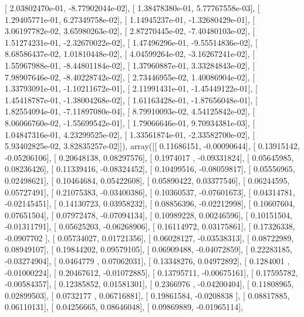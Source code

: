 \documentclass{article}
\begin{document}
       [  2.03802470e-01,  -8.77902044e-02],
       [  1.38478380e-01,   5.77767558e-03],
       [  1.29405771e-01,   6.27349758e-02],
       [  1.14945237e-01,  -1.32680429e-01],
       [  3.06197782e-02,   3.65980263e-02],
       [  2.87270445e-02,  -7.40480103e-02],
       [  1.51274231e-01,  -2.32670022e-02],
       [  1.47496296e-01,  -9.55514836e-02],
       [  8.68586437e-02,   1.01810448e-02],
       [  4.04599264e-02,  -3.16267241e-02],
       [  1.55967988e-01,  -8.44801184e-02],
       [  1.37960887e-01,   3.33284843e-02],
       [  7.98907646e-02,  -8.40228742e-02],
       [  2.73446955e-02,   1.40086904e-02],
       [  1.33793091e-01,  -1.10211672e-01],
       [  2.11991431e-01,  -1.45449122e-01],
       [  1.45418787e-01,  -1.38004268e-02],
       [  1.61163428e-01,  -1.87656048e-01],
       [  1.82554094e-01,  -7.11897080e-04],
       [  8.79910093e-02,   4.54125842e-02],
       [  8.06066760e-02,  -1.55699542e-01],
       [  1.79066646e-01,   9.70934381e-03],
       [  1.04847316e-01,   4.23299525e-02],
       [  1.33561874e-01,  -2.33582700e-02],
       [  5.93402825e-02,   3.82835257e-02]]), array([[ 0.11686151, -0.00090644],
       [ 0.13915142, -0.05206106],
       [ 0.20648138,  0.08297576],
       [ 0.1974017 , -0.09331824],
       [ 0.05645985,  0.08236426],
       [ 0.11339416, -0.08324452],
       [ 0.10499516, -0.08059817],
       [ 0.05556965,  0.02498621],
       [ 0.10464684,  0.05422608],
       [ 0.05890422,  0.03377546],
       [ 0.06244595,  0.05727491],
       [ 0.21075383, -0.03400386],
       [ 0.10360537, -0.07601673],
       [ 0.04314781, -0.02145451],
       [ 0.14130723,  0.03958232],
       [ 0.08856396, -0.02212998],
       [ 0.10607604,  0.07651504],
       [ 0.07972478, -0.07094134],
       [ 0.10989228,  0.00246596],
       [ 0.10151504, -0.01311791],
       [ 0.05625203, -0.06268906],
       [ 0.16114972,  0.03175861],
       [ 0.17326338, -0.0907702 ],
       [ 0.05734027,  0.01721356],
       [ 0.06028127, -0.03538313],
       [ 0.08722989,  0.08949107],
       [ 0.19844202,  0.09579105],
       [ 0.06909488, -0.04072859],
       [ 0.22283185, -0.03274904],
       [ 0.0464779 ,  0.07062031],
       [ 0.13348276,  0.04972892],
       [ 0.1284001 , -0.01000224],
       [ 0.20467612, -0.01072885],
       [ 0.13795711, -0.00675161],
       [ 0.17595782, -0.00584357],
       [ 0.12385852,  0.01581301],
       [ 0.2366976 , -0.04200404],
       [ 0.11808965,  0.02899503],
       [ 0.0732177 ,  0.06716881],
       [ 0.19861584, -0.0208838 ],
       [ 0.08817885,  0.06110131],
       [ 0.04256665,  0.08646048],
       [ 0.09869889, -0.01965114],
\end{document}

